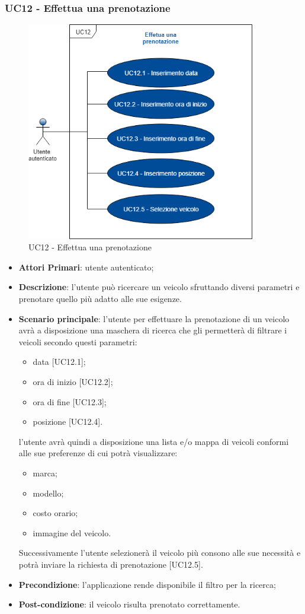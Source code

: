 \subsubsection{UC12 - Effettua una prenotazione}
\begin{figure}[h]
	\includegraphics[width=10cm]{res/images/UC13Effettuaprenotazione.png}
	\centering
	\caption{UC12 - Effettua una prenotazione}
\end{figure}
\begin{itemize}
	\item \textbf{Attori Primari}: utente autenticato;
	\item \textbf{Descrizione}: l'utente può ricercare un veicolo sfruttando diversi parametri e prenotare quello più adatto alle sue esigenze.
	\item \textbf{Scenario principale}: l'utente per effettuare la prenotazione di un veicolo avrà a disposizione una maschera di ricerca che gli permetterà di filtrare i veicoli secondo questi parametri:
	\begin{itemize}
		\item data [UC12.1];
		\item ora di inizio [UC12.2];
		\item ora di fine [UC12.3];
		\item posizione [UC12.4]. 
	\end{itemize}
	l'utente avrà quindi a disposizione una lista e/o mappa di veicoli conformi alle sue preferenze di cui potrà visualizzare:
	\begin{itemize}		
		\item marca;
		\item modello;
		\item costo orario;
		\item immagine del veicolo.
	\end{itemize}
	Successivamente l'utente selezionerà il veicolo più consono alle sue necessità e potrà inviare la richiesta di prenotazione [UC12.5].
	\item \textbf{Precondizione}: l'applicazione rende disponibile il filtro per la ricerca;
	\item \textbf{Post-condizione}: il veicolo risulta prenotato correttamente.
\end{itemize} 
